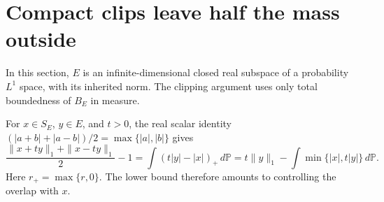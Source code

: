\section{Compact clips leave half the mass outside}\label{sec:clips}

In this section, $E$ is an infinite-dimensional closed real subspace of
a probability $L^1$ space, with its inherited norm. The clipping
argument uses only total boundedness of $B_E$ in measure.

For $x\in S_E$, $y\in E$, and $t>0$, the real scalar identity
$(|a+b|+|a-b|)/2=\max\{|a|,|b|\}$ gives
\begin{equation}\label{eq:overlap-identity}
 \frac{\|x+ty\|_1+\|x-ty\|_1}{2}-1
 =\int(t|y|-|x|)_+\,d\mathbb P
 =t\|y\|_1-\int\min\{|x|,t|y|\}\,d\mathbb P.
\end{equation}
Here $r_+=\max\{r,0\}$.  The lower bound therefore amounts to controlling
the overlap with $x$.

